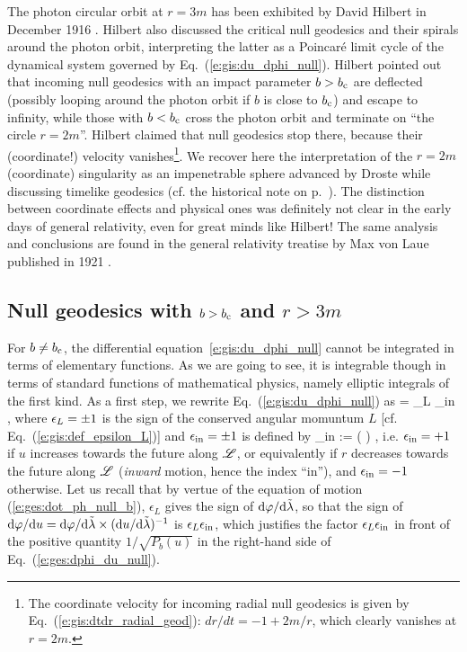 \begin{hist}
The photon circular orbit at $r=3m$ has been exhibited by David Hilbert
in December 1916 \cite{Hilbe1917a,Hilbe1917b}. Hilbert also discussed the
critical null geodesics and their spirals
around the photon orbit, interpreting the latter as a Poincaré limit cycle
of the dynamical system governed by Eq.~(\ref{e:gis:du_dphi_null}).
Hilbert pointed out that incoming null geodesics with an impact parameter
$b > b_{\rm c}$ are deflected (possibly looping
around the photon orbit if $b$ is close to $b_{\rm c}$) and escape to infinity,
while those with $b < b_{\rm c}$ cross the photon orbit and terminate on ``the circle
$r=2m$''. Hilbert claimed that null geodesics stop there, because
their (coordinate!) velocity vanishes\footnote{The coordinate velocity for
incoming radial null geodesics is given by Eq.~(\ref{e:gis:dtdr_radial_geod}):
$dr/dt = - 1 + 2m/r$, which clearly vanishes at $r=2m$.}. We recover here the interpretation
of the $r=2m$ (coordinate) singularity as an impenetrable sphere advanced by Droste while discussing
timelike geodesics (cf. the historical note on p.~\pageref{h:ges:geod}). The distinction
between coordinate effects and physical ones was definitely not clear in the early
days of general relativity, even for great minds like Hilbert!
The same analysis and conclusions are found in the general relativity treatise
by Max von Laue published in 1921 \cite{Laue1921}.
\end{hist}

\subsection{Null geodesics with $b > b_{\rm c}$ and $r> 3m$} \label{s:gis:geod_b_gt_bc_out}

For $b \not= b_{\rm c}$, the differential equation~\eqref{e:gis:du_dphi_null} cannot be integrated
in terms of elementary functions. As we are going to see, it is integrable
though in terms of standard
functions of mathematical physics, namely elliptic integrals of the first kind.
As a first step, we rewrite Eq.~(\ref{e:gis:du_dphi_null}) as
\be \label{e:ges:dphi_du_null}
    = \eps_L \eps_{\rm in}   ,
\ee
where $\epsilon_L = \pm 1$ is the sign of the conserved angular momuntum $L$
[cf. Eq.~(\ref{e:gis:def_epsilon_L})] and $\epsilon_{\rm in} = \pm 1$ is
defined by
\be
    \eps_{\rm in} :=  \left(  \right) ,
\ee
i.e. $\epsilon_{\rm in} = +1$ if $u$ increases towards the future along $\mathscr{L}$, or equivalently
if $r$ decreases towards the future along $\mathscr{L}$ (\emph{inward} motion, hence the index ``in''),
and $\epsilon_{\rm in} = -1$ otherwise.
Let us recall that by vertue of the equation of motion (\ref{e:ges:dot_ph_null_b}),
$\epsilon_L$ gives the sign of $\mathrm{d}\varphi/\mathrm{d}{\tilde\lambda}$, so that the sign of
$\mathrm{d}\varphi/\mathrm{d} u = \mathrm{d}\varphi/\mathrm{d}{\tilde\lambda} \times (\mathrm{d} u/\mathrm{d}{\tilde\lambda})^{-1}$ is $\epsilon_L \epsilon_{\rm in}$,
which justifies the factor $\epsilon_L \epsilon_{\rm in}$ in front of the positive
quantity $1/\sqrt{P_b(u)}$ in the right-hand side of Eq.~(\ref{e:ges:dphi_du_null}).

